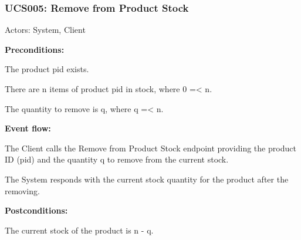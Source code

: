 \begin{ucbox}{\subsubsection{UCS005: Remove from Product Stock}}
\label{UCS005}

Actors: System, Client

\textbf{Preconditions:}

\ucitem The product pid exists.

\ucitem There are n items of product pid in stock, where 0 =< n.

\ucitem The quantity to remove is q, where q =< n.

\textbf{Event flow:}

\ucitem The Client calls the Remove from Product Stock endpoint providing the product ID (pid) and the quantity q to remove from the current stock.

\ucitem The System responds with the current stock quantity for the product after the removing.

\textbf{Postconditions:}

\ucitem The current stock of the product is n - q.

\end{ucbox}
\newpage